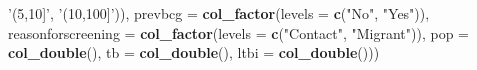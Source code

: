 \documentclass[]{article}
\newenvironment{Shaded}{\begin{snugshade}}{\end{snugshade}}
\newcommand{\DataTypeTok}[1]{\textcolor[rgb]{0.13,0.29,0.53}{#1}}
\newcommand{\KeywordTok}[1]{\textcolor[rgb]{0.13,0.29,0.53}{\textbf{#1}}}
\newcommand{\NormalTok}[1]{#1}
\newcommand{\StringTok}[1]{\textcolor[rgb]{0.31,0.60,0.02}{#1}}
\begin{document}
\begin{Shaded}
\begin{Highlighting}[]
                                                                        \StringTok{'(5,10]'}\NormalTok{,}
                                                                        \StringTok{'(10,100]'}\NormalTok{)),}
                                   \DataTypeTok{prevbcg =} \KeywordTok{col_factor}\NormalTok{(}\DataTypeTok{levels =}
                                                          \KeywordTok{c}\NormalTok{(}\StringTok{"No"}\NormalTok{, }\StringTok{"Yes"}\NormalTok{)),}
                                   \DataTypeTok{reasonforscreening =} \KeywordTok{col_factor}\NormalTok{(}\DataTypeTok{levels =}
                                                                     \KeywordTok{c}\NormalTok{(}\StringTok{"Contact"}\NormalTok{,}
                                                                       \StringTok{"Migrant"}\NormalTok{)),}
                                   \DataTypeTok{pop =} \KeywordTok{col_double}\NormalTok{(),}
                                   \DataTypeTok{tb =} \KeywordTok{col_double}\NormalTok{(),}
                                   \DataTypeTok{ltbi =} \KeywordTok{col_double}\NormalTok{()))}
\end{Highlighting}
\end{Shaded}
\end{document}

